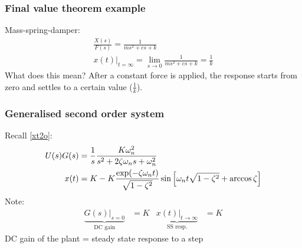 \documentclass{beamer-control}
\begin{document}
\begin{frame}
\frametitle{Final value theorem example}

Mass-spring-damper:
\begin{gather}
\frac{X(s)}{F(s)} = \frac{1}{ms^2+cs+k} \\
x(t)|_{t=\infty} = \lim_{s\to0} \frac{1}{ms^2+cs+k} = \frac{1}{k}
\end{gather}
What does this mean? After a constant force is applied, the response starts from zero and settles to a certain value ($\frac{1}{k}$).

\bigskip
{}
\end{frame}

\begin{frame}
\frametitle{Generalised second order system}
Recall \eqref{xt2o}:
\begin{align}
U(s)G(s) & = \frac{1}{s}\frac{K\omega_n^2}{s^2+2\zeta\omega_ns+\omega_n^2} \\
x(t) &= K - K\frac{\exp(-\zeta\omega_n t)}{\sqrt{1-\zeta^2}}\sin\left[\omega_n t\sqrt{1-\zeta^2}+\arccos\zeta\right]
\end{align}
Note:
\begin{align}
\underbrace{G(s)|_{s=0}}_{\text{DC gain}} &= K & \underbrace{x(t)|_{t\to \infty}}_{\text{SS resp.}} &= K
\end{align}
DC gain of the plant = steady state response to a step
\end{frame}

\SUMMARYFRAME
\FINALE
\end{document}
